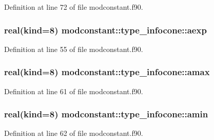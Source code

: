 Definition at line 72 of file modconstant.\+f90.

\subsubsection[{\texorpdfstring{aexp}{aexp}}]{\setlength{\rightskip}{0pt plus 5cm}real(kind=8) modconstant\+::type\+\_\+infocone\+::aexp}\hypertarget{structmodconstant_1_1type__infocone_ac3a5d891e4c144a6391de4445dd2e675}{}\label{structmodconstant_1_1type__infocone_ac3a5d891e4c144a6391de4445dd2e675}


Definition at line 55 of file modconstant.\+f90.

\subsubsection[{\texorpdfstring{amax}{amax}}]{\setlength{\rightskip}{0pt plus 5cm}real(kind=8) modconstant\+::type\+\_\+infocone\+::amax}\hypertarget{structmodconstant_1_1type__infocone_a4f92a39c770ead2115957fb7e05ce22a}{}\label{structmodconstant_1_1type__infocone_a4f92a39c770ead2115957fb7e05ce22a}


Definition at line 61 of file modconstant.\+f90.

\subsubsection[{\texorpdfstring{amin}{amin}}]{\setlength{\rightskip}{0pt plus 5cm}real(kind=8) modconstant\+::type\+\_\+infocone\+::amin}\hypertarget{structmodconstant_1_1type__infocone_a4c48af6759d2e76017ed219c17b488ff}{}\label{structmodconstant_1_1type__infocone_a4c48af6759d2e76017ed219c17b488ff}


Definition at line 62 of file modconstant.\+f90.

